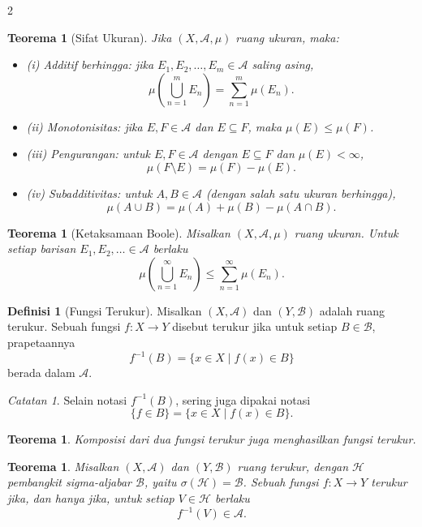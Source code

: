 \documentclass[a4paper,extrafontsizes, 9pt]{memoir}
\theoremstyle{definition}
\newtheorem{definisi}[kalstok]{Definisi}
\theoremstyle{plain}
\newtheorem{teorema}[kalstok]{Teorema}
\theoremstyle{remark}
\newtheorem{catatan}[kalstok]{Catatan}
\begin{document}
\begin{multicols}{2}
  \begin{teorema}[Sifat Ukuran]
    Jika $(X,\mathcal{A},\mu)$ ruang ukuran, maka:
    \begin{itemize}[leftmargin=*, itemsep=0.5mm]
      \item (i) Additif berhingga: jika $E_1,E_2,\ldots,E_m\in\mathcal{A}$ saling asing,
            \[\mu\!\left(\bigcup_{n=1}^{m}E_n\right)=\sum_{n=1}^{m}\mu(E_n).\]
      \item (ii) Monotonisitas: jika $E,F\in\mathcal{A}$ dan $E\subseteq F$, maka $\mu(E)\leq\mu(F)$.
      \item (iii) Pengurangan: untuk $E,F\in\mathcal{A}$ dengan $E\subseteq F$ dan $\mu(E)<\infty$,
            \[\mu(F\setminus E)=\mu(F)-\mu(E).\]
      \item (iv) Subadditivitas: untuk $A,B\in\mathcal{A}$ (dengan salah satu ukuran berhingga),
            \[\mu(A\cup B)=\mu(A)+\mu(B)-\mu(A\cap B).\]
    \end{itemize}
  \end{teorema}

  \begin{teorema}[Ketaksamaan Boole]
    Misalkan $(X,\mathcal{A},\mu)$ ruang ukuran. Untuk setiap barisan $E_1,E_2,\ldots\in\mathcal{A}$ berlaku
    \[\mu\!\left(\bigcup_{n=1}^{\infty}E_n\right)\leq\sum_{n=1}^{\infty}\mu(E_n).\]
  \end{teorema}

  \begin{definisi}[Fungsi Terukur]
    Misalkan $(X,\mathcal{A})$ dan $(Y,\mathcal{B})$ adalah ruang terukur.
    Sebuah fungsi $f:X\to Y$ disebut terukur jika untuk setiap $B\in\mathcal{B}$, prapetaannya
    \[f^{-1}(B)=\{x\in X\mid f(x)\in B\}\]
    berada dalam $\mathcal{A}$.
  \end{definisi}

  \begin{catatan}
    Selain notasi $f^{-1}(B)$, sering juga dipakai notasi
    \[\{f\in B\}=\{x\in X\mid f(x)\in B\}.\]
  \end{catatan}

  \begin{teorema}
    Komposisi dari dua fungsi terukur juga menghasilkan fungsi terukur.
  \end{teorema}

  \begin{teorema}
    Misalkan $(X,\mathcal{A})$ dan $(Y,\mathcal{B})$ ruang terukur, dengan $\mathcal{H}$ pembangkit sigma-aljabar $\mathcal{B}$, yaitu $\sigma(\mathcal{H})=\mathcal{B}$.
    Sebuah fungsi $f:X\to Y$ terukur jika, dan hanya jika, untuk setiap $V\in\mathcal{H}$ berlaku
    \[f^{-1}(V)\in\mathcal{A}.\]
  \end{teorema}


\end{multicols}
\end{document}
